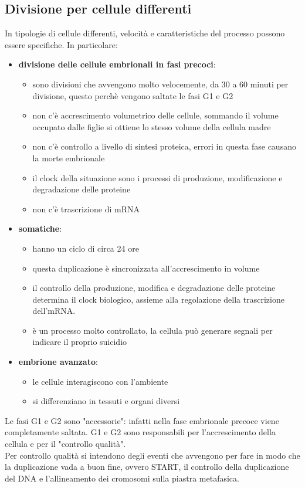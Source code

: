     \subsection{Divisione per cellule differenti}
        In tipologie di cellule differenti, velocità e caratteristiche del processo possono essere specifiche. In particolare:
        \begin{itemize}
            \item \textbf{divisione delle cellule embrionali in fasi precoci}:
                \begin{itemize}
                    \item sono divisioni che avvengono molto velocemente, da 30 a 60 minuti per divisione, questo perchè vengono saltate le fasi G1 e G2
                    \item non c'è accrescimento volumetrico delle cellule, sommando il volume occupato dalle figlie si ottiene lo stesso volume della cellula madre
                    \item non c'è controllo a livello di sintesi proteica, errori in questa fase causano la morte embrionale
                    \item il clock della situazione sono i processi di produzione, modificazione e degradazione delle proteine
                    \item non c'è trascrizione di mRNA
                \end{itemize}
            \item \textbf{somatiche}:
                \begin{itemize}
                    \item hanno un ciclo di circa 24 ore
                    \item questa duplicazione è sincronizzata all'accrescimento in volume
                    \item il controllo della produzione, modifica e degradazione delle proteine determina il clock biologico, assieme alla regolazione della trascrizione dell'mRNA.
                    \item è un processo molto controllato, la cellula può generare segnali per indicare il proprio suicidio
                \end{itemize}
            \item \textbf{embrione avanzato}:
                \begin{itemize}
                    \item le cellule interagiscono con l'ambiente
                    \item si differenziano in tessuti e organi diversi
                \end{itemize}
        \end{itemize}
        Le fasi G1 e G2 sono "accessorie": infatti nella fase embrionale precoce viene completamente saltata. G1 e G2 sono responsabili per l'accrescimento della cellula e per il "controllo qualità". \\
        Per controllo qualità si intendono degli eventi che avvengono per fare in modo che la duplicazione vada a buon fine, ovvero START, il controllo della duplicazione del DNA e l'allineamento dei cromosomi sulla piastra metafasica.
